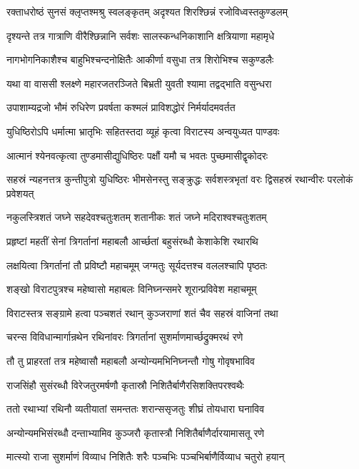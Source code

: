 \twolineshloka
{रक्ताधरोष्ठं सुनसं क्लृप्तश्मश्रु स्वलङ्कृतम्}
{अदृश्यत शिरश्छिन्नं रजोविध्वस्तकुण्डलम्}


\twolineshloka
{दृश्यन्ते तत्र गात्राणि वीरैश्छिन्नानि सर्वशः}
{सालस्कन्धनिकाशानि क्षत्रियाणा महामृधे}


\twolineshloka
{नागभोगनिकाशैश्च बाहुभिश्चन्दनोक्षितैः}
{आकीर्णा वसुधा तत्र शिरोभिश्च सकुण्डलैः}


\twolineshloka
{यथा वा वाससी श्लक्ष्णे महारजतरञ्जिते}
{बिभ्रती युवती श्यामा तद्वद्भाति वसुन्धरा}


\twolineshloka
{उपाशाम्यद्रजो भौमं रुधिरेण प्रवर्षता}
{कश्मलं प्राविशद्धोरं निर्मर्यादमवर्तत}


\twolineshloka
{युधिष्ठिरोऽपि धर्मात्मा भ्रातृभिः सहितस्तदा}
{व्यूहं कृत्वा विराटस्य अन्वयुध्यत पाण्डवः}


\twolineshloka
{आत्मानं श्येनवत्कृत्वा तुण्डमासीद्युधिष्ठिरः}
{पक्षौं यमौ च भवतः पुच्छमासीद्वृकोदरः}


\threelineshloka
{सहस्रं न्यहनत्तत्र कुन्तीपुत्रो युधिष्ठिरः}
{भीमसेनस्तु सङ्क्रुद्धः सर्वशस्त्रभृतां वरः}
{द्विसहस्रं रथान्वीरः परलोकं प्रवेशयत्}


\twolineshloka
{नकुलस्त्रिशतं जघ्ने सहदेवश्चतुःशतम्}
{शतानीकः शतं जघ्ने मदिराश्वश्चतुःशतम्}


\twolineshloka
{प्रहृष्टां महतीं सेनां त्रिगर्तानां महाबलौ}
{आर्च्छतां बहुसंरब्धौ केशाकेशि रथारथि}


\twolineshloka
{लक्षयित्वा त्रिगर्तानां तौ प्रविष्टौ महाचमूम्}
{जग्मतुः सूर्यदत्तश्च वललश्चापि पृष्ठतः}


\twolineshloka
{शङ्खो विराटपुत्रश्च महेष्वासो महाबलः}
{विनिघ्नन्समरे शूरान्प्रविवेश महाचमूम्}


\twolineshloka
{विराटस्तत्र सङ्ग्रामे हत्वा पञ्चशतं रथान्}
{कुञ्जराणां शतं चैव सहस्रं वाजिनां तथा}


\twolineshloka
{चरन्स विविधान्मार्गान्रथेन रथिनांवरः}
{त्रिगर्तानां सुशर्माणमार्च्छद्रुक्मरथं रणे}


\twolineshloka
{तौ तु प्राहरतां तत्र महेष्वासौ महाबलौ}
{अन्योन्यमभिनिघ्नन्तौ गोषु गोवृषभाविव}


\twolineshloka
{राजसिंहौ सुसंरब्धौ विरेजतुरमर्षणौ}
{कृतास्रौ निशितैर्बाणैरसिशक्तिपरश्वथैः}


\twolineshloka
{ततो रथाभ्यां रथिनौ व्यतीयातां समन्ततः}
{शरान्ससृजतुः शीघ्रं तोयधारा घनाविव}


\twolineshloka
{अन्योन्यमभिसंरब्धौ दन्ताभ्यामिव कुञ्जरौ}
{कृतास्त्रौ निशितैर्बाणैर्दारयामासतू रणे}


\twolineshloka
{मात्स्यो राजा सुशर्माणं विव्याध निशितैः शरैः}
{पञ्चभिः पञ्चभिर्बाणैर्विव्याध चतुरो हयान्}



